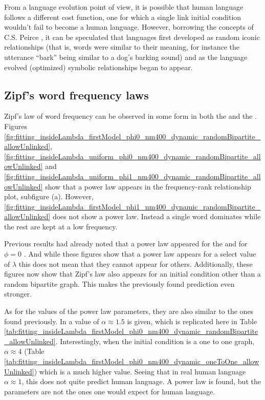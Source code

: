 From a language evolution point of view, it is possible that human language follows a different cost function, one for which a single link initial condition wouldn't fail to become a human language.
However, borrowing the concepts of C.S. Peirce \cite{Atkin2010a}, it can be speculated that languages first developed as random iconic relationships (that is, words were similar to their meaning, for instance the utterance ``bark'' being similar to a dog's barking sound) and as the language evolved (optimized) symbolic relationships began to appear.

\subsection{Zipf's word frequency laws}
\label{sec:discussion_math_word-freq}

Zipf's law of word frequency can be observed in some form in both the \firstmodel{} and the \secondmodel{}.
Figures \ref{fig:fitting_insideLambda_firstModel_phi0_nm400_dynamic_randomBipartite_allowUnlinked}, \ref{fig:fitting_insideLambda_uniform_phi0_nm400_dynamic_randomBipartite_allowUnlinked} and \ref{fig:fitting_insideLambda_uniform_phi1_nm400_dynamic_randomBipartite_allowUnlinked} show that a power law appears in the frequency-rank relationship plot, subfigure (a).
However, \ref{fig:fitting_insideLambda_firstModel_phi1_nm400_dynamic_randomBipartite_allowUnlinked} does not show a power law.
Instead a single word dominates while the rest are kept at a low frequency.

Previous results had already noted that a power law appeared for the \firstm{} and \secondmodel{} for $\phi=0$ \cite{Ferrer2005a} \cite{Ferrer2003a}.
And while these figures show that a power law appears for a select value of $\lambda$ this does not mean that they cannot appear for others.
Additionally, these figures now show that Zipf's law also appears for an initial condition other than a random bipartite graph.
This makes the previously found prediction even stronger.

As for the values of the power law parameters, they are also similar to the ones found previously.
In \cite{Ferrer2005a} a value of $\alpha \approx 1.5$ is given, which is replicated here in Table \ref{tab:fitting_insideLambda_firstModel_phi0_nm400_dynamic_randomBipartite_allowUnlinked}.
Interestingly, when the initial condition is a one to one graph, $\alpha \approx 4$ (Table \ref{tab:fitting_insideLambda_firstModel_phi0_nm400_dynamic_oneToOne_allowUnlinked}) which is a much higher value.
Seeing that in real human language $\alpha \approx 1$, this does not quite predict human language.
A power law is found, but the parameters are not the ones one would expect for human language.

